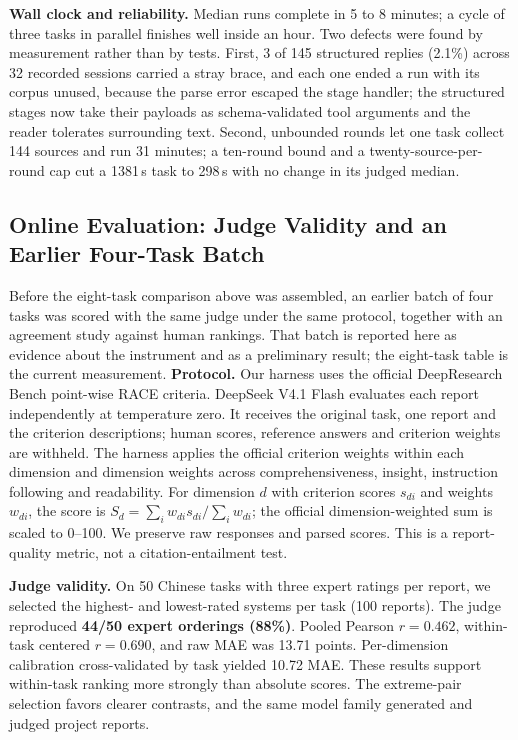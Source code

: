 \documentclass[conference]{IEEEtran}
\begin{document}
\textbf{Wall clock and reliability.} Median runs complete in 5 to 8 minutes; a cycle of three tasks in parallel finishes well inside an hour. Two defects were found by measurement rather than by tests. First, 3 of 145 structured replies (2.1\%) across 32 recorded sessions carried a stray brace, and each one ended a run with its corpus unused, because the parse error escaped the stage handler; the structured stages now take their payloads as schema-validated tool arguments and the reader tolerates surrounding text. Second, unbounded rounds let one task collect 144 sources and run 31 minutes; a ten-round bound and a twenty-source-per-round cap cut a 1381\,s task to 298\,s with no change in its judged median.

\subsection{Online Evaluation: Judge Validity and an Earlier Four-Task Batch}

Before the eight-task comparison above was assembled, an earlier batch of four tasks was scored with the
same judge under the same protocol, together with an agreement study against human rankings. That batch is
reported here as evidence about the instrument and as a preliminary result; the eight-task table is the
current measurement.
\textbf{Protocol.} Our harness uses the official DeepResearch Bench point-wise RACE criteria. DeepSeek V4.1 Flash evaluates each report independently at temperature zero. It receives the original task, one report and the criterion descriptions; human scores, reference answers and criterion weights are withheld. The harness applies the official criterion weights within each dimension and dimension weights across comprehensiveness, insight, instruction following and readability. For dimension $d$ with criterion scores $s_{di}$ and weights $w_{di}$, the score is $S_d=\sum_i w_{di}s_{di}/\sum_i w_{di}$; the official dimension-weighted sum is scaled to 0--100. We preserve raw responses and parsed scores. This is a report-quality metric, not a citation-entailment test.

\textbf{Judge validity.} On 50 Chinese tasks with three expert ratings per report, we selected the highest- and lowest-rated systems per task (100 reports). The judge reproduced \textbf{44/50 expert orderings (88\%)}. Pooled Pearson $r=0.462$, within-task centered $r=0.690$, and raw MAE was 13.71 points. Per-dimension calibration cross-validated by task yielded 10.72 MAE. These results support within-task ranking more strongly than absolute scores. The extreme-pair selection favors clearer contrasts, and the same model family generated and judged project reports.
\end{document}
